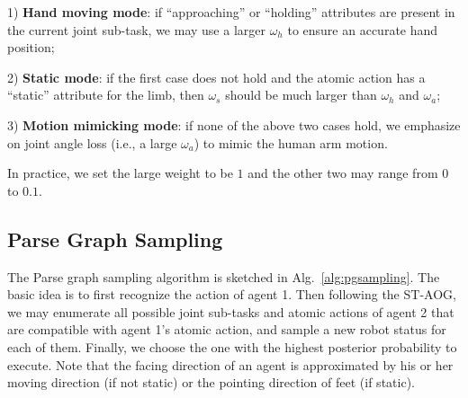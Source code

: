 \documentclass[letterpaper, 10 pt, conference]{ieeeconf}  %
\begin{document}
1) \textbf{Hand moving mode}: if ``approaching'' or ``holding'' attributes are present in the current joint sub-task, we may use a larger $\omega_h$ to ensure an accurate hand position;

2) \textbf{Static mode}: if the first case does not hold and the atomic action has a ``static'' attribute for the limb, then $\omega_s$ should be much larger than $\omega_h$ and $\omega_a$; 

3) \textbf{Motion mimicking mode}: if none of the above two cases hold, we emphasize on joint angle loss (i.e., a large $\omega_a$) to mimic the human arm motion.


In practice, we set the large weight to be $1$ and the other two may range from $0$ to $0.1$.




\subsection{Parse Graph Sampling}

The Parse graph sampling algorithm is sketched in Alg.~{\ref{alg:pgsampling}}. The basic idea is to first recognize the action of agent 1. Then following the ST-AOG, we may enumerate all possible joint sub-tasks and atomic actions of agent 2 that are compatible with agent 1's atomic action, and sample a new robot status for each of them. Finally, we choose the one with the highest posterior probability to execute. Note that the facing direction of an agent is approximated by his or her moving direction (if not static) or the pointing direction of feet (if static).



\end{document}

